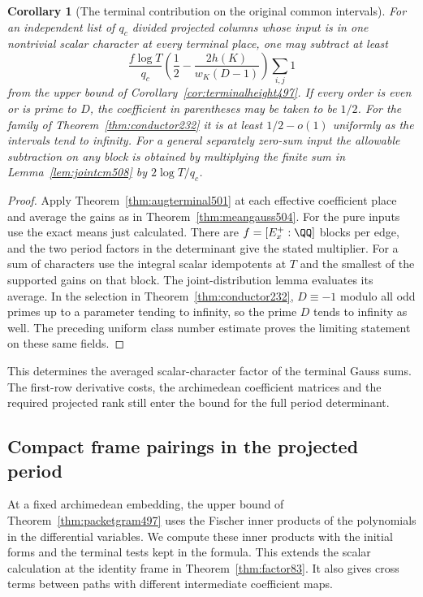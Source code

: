 \documentclass[a4paper,11pt]{article}
\newtheorem{corollary}[proposition]{Corollary}
\theoremstyle{definition}
\theoremstyle{remark}
\numberwithin{equation}{section}
\begin{document}
\begin{corollary}[The terminal contribution on the original common intervals]\leavevmode
\label{cor:cmcomp508}
For an independent list of \(q_c\) divided projected columns
whose input is in one nontrivial scalar character at every
terminal place, one may subtract at least
\[
    \frac{f\log T}{q_c}
       \left(\frac12-\frac{2h(K)}{w_K(D-1)}\right)
                                    \sum_{i,j}1
\]
from the upper bound of Corollary~\ref{cor:terminalheight497}.
If every order is even or is prime to \(D\), the coefficient
in parentheses may be taken to be \(1/2\). For the family
of Theorem~\ref{thm:conductor232} it is at least \(1/2-o(1)\)
uniformly as the intervals tend to infinity. For a general
separately zero-sum input the allowable subtraction on any
block is obtained by multiplying the finite sum in
Lemma~\ref{lem:jointcm508} by \(2\log T/q_c\).
\end{corollary}
\begin{proof}
Apply Theorem~\ref{thm:augterminal501} at each effective
coefficient place and average the gains as in
Theorem~\ref{thm:meangauss504}. For the pure inputs use the
exact means just calculated. There are \(f=[E_x^+:\QQ]\)
blocks per edge, and the two period factors in the determinant
give the stated multiplier. For a sum of characters use the
integral scalar idempotents at \(T\) and the smallest of the
supported gains on that block. The joint-distribution lemma
evaluates its average. In the selection in
Theorem~\ref{thm:conductor232}, \(D\equiv-1\) modulo all odd
primes up to a parameter tending to infinity, so the prime
\(D\) tends to infinity as well. The preceding uniform
class number estimate proves the limiting statement on these
same fields.
\end{proof}

This determines the averaged scalar-character factor of
the terminal Gauss sums. The first-row derivative costs, the
archimedean coefficient matrices and the required projected rank
still enter the bound for the full period determinant.


\subsection{Compact frame pairings in the projected period}
\label{sec:framepair509}

At a fixed archimedean embedding, the upper bound of
Theorem~\ref{thm:packetgram497} uses the Fischer inner products of
the polynomials in the differential variables. We compute these
inner products with the initial forms and the terminal tests kept
in the formula. This extends the scalar calculation at the identity
frame in Theorem~\ref{thm:factor83}. It also gives cross terms
between paths with different intermediate coefficient maps.
\end{document}
